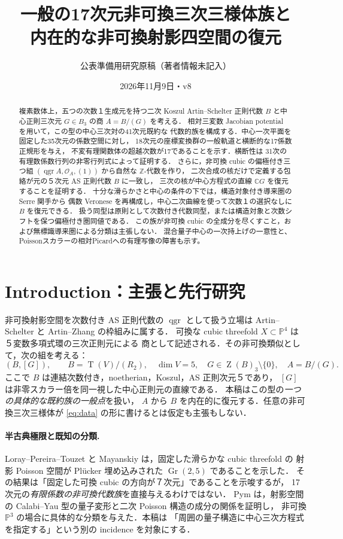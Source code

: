 \documentclass[11pt,a4paper]{ltjsarticle}
\title{一般の17次元非可換三次三様体族と\\内在的な非可換射影四空間の復元}
\author{公表準備用研究原稿（著者情報未記入）}
\date{2026年11月9日・v8}
\numberwithin{equation}{section}
\newcommand{\C}{\mathbb C}
\newcommand{\PP}{\mathbb P}
\newcommand{\OO}{\mathcal O}
\newcommand{\qgr}{\operatorname{qgr}}
\newcommand{\Z}{\operatorname{Z}}
\newcommand{\Tens}{\operatorname{T}}
\begin{document}
\maketitle
\begin{abstract}
複素数体上，五つの次数１生成元を持つ二次 Koszul Artin--Schelter 正則代数
$B$ と中心正則三次元 $G\in B_3$ の商 $A=B/(G)$ を考える．
相対三変数 Jacobian potential を用いて，この型の中心三次対の41次元既約な
代数的族を構成する．中心一次平面を固定した35次元の係数空間に対し，
18次元の座標変換群の一般軌道と横断的な17係数正規形を与え，
不変有理関数体の超越次数が17であることを示す．横断性は
31次の有理数係数行列の非零行列式によって証明する．
さらに，非可換 cubic の偏極付き三つ組
$(\qgr A,\OO_A,(1))$ から自然な $\mathbb Z$-代数を作り，
二次合成の核だけで定義する包絡が元の５次元 AS 正則代数 $B$ に一致し，
三次の核が中心方程式の直線 $\C G$ を復元することを証明する．
十分な滑らかさと中心の条件の下では，構造対象付き導来圏の Serre 関手から
偶数 Veronese を再構成し，中心二次曲線を使って次数１の選択なしに $B$ を復元できる．
扱う同型は原則として次数付き代数同型，または構造対象と次数シフトを保つ偏極付き圏同値である．
この族が非可換 cubic の全成分を尽くすこと，および無標識導来圏による分類は主張しない．
混合量子中心の一次持上げの一意性と、Poissonスカラーの相対Picardへの有理写像の障害も示す。
\end{abstract}
\tableofcontents

\section{Introduction：主張と先行研究}\label{sec:intro}
非可換射影空間を次数付き AS 正則代数の $\qgr$ として扱う立場は
Artin--Schelter \cite{AS} と Artin--Zhang \cite{AZ} の枠組みに属する．
可換な cubic threefold $X\subset\PP^4$ は５変数多項式環の三次正則元による
商として記述される．その非可換類似として，次の組を考える：
\begin{equation}\label{eq:data}
 (B,[G]),\qquad B=\Tens(V)/(R_2),\quad\dim V=5,\quad
 G\in\Z(B)_3\setminus\{0\},\quad A=B/(G).
\end{equation}
ここで $B$ は連結次数付き，noetherian，Koszul，AS 正則次元５であり，
$[G]$ は非零スカラー倍を同一視した中心正則元の直線である．
本稿はこの型の\emph{一つの具体的な既約族の一般点}を扱い，
$A$ から $B$ を内在的に復元する．任意の非可換三次三様体が
\eqref{eq:data} の形に書けるとは仮定も主張もしない．

\paragraph{半古典極限と既知の分類.}
Loray--Pereira--Touzet \cite[Theorem~9.1]{LPT} と
Mayanskiy \cite[Theorem~1]{Mayanskiy} は，固定した滑らかな cubic threefold の
射影 Poisson 空間が Pl\"ucker 埋め込みされた $\operatorname{Gr}(2,5)$ であることを示した．
その結果は「固定した可換 cubic の方向が７次元」であることを示唆するが，
17次元の\emph{有限係数の非可換代数族}を直接与えるわけではない．
Pym \cite[Proposition~2.9, Theorem~2.10]{Pym} は，射影空間の
Calabi--Yau 型の量子変形と二次 Poisson 構造の成分の関係を証明し，
非可換 $\PP^3$ の場合に具体的な分類を与えた．本稿は
「周囲の量子構造に中心三次方程式を指定する」という別の incidence を対象にする．
\end{document}
